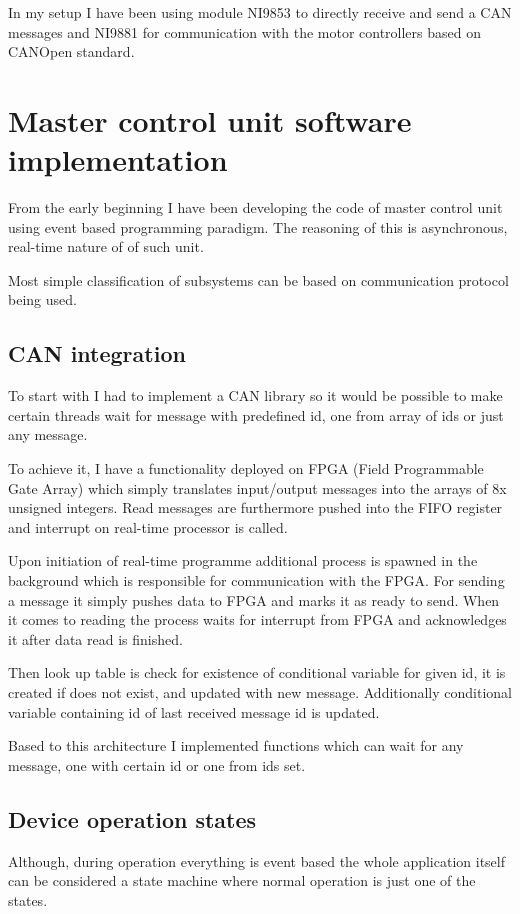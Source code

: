 In my setup I have been using module NI9853 to directly receive and send a CAN messages and NI9881 for communication with the motor controllers based on CANOpen standard.

\section{Master control unit software implementation}
From the early beginning I have been developing the code of master control unit using event based programming paradigm. The reasoning of this is asynchronous, real-time nature of of such unit.

Most simple classification of subsystems can be based on communication protocol being used. 

\subsection{CAN integration}
To start with I had to implement a CAN library so it would be possible to make certain threads wait for message with predefined id, one from array of ids or just any message. 

To achieve it, I have a functionality deployed on FPGA (Field Programmable Gate Array) which simply translates input/output messages into the arrays of 8x unsigned integers. Read messages  are furthermore pushed into the FIFO register and interrupt on real-time processor is called.

Upon initiation of real-time programme additional process is spawned in the background which is responsible for communication with the FPGA. For sending a message it simply pushes data to FPGA and marks it as ready to send. When it comes to reading the process waits for interrupt from FPGA and acknowledges it after data read is finished. 

Then look up table is check for existence of conditional variable for given id, it is created if does not exist, and updated with new message. Additionally conditional variable containing id of last received message id is updated.

Based to this architecture I implemented functions which can wait for any message, one with certain id or one from ids set.

\subsection{Device operation states}
Although, during operation everything is event based the whole application itself can be considered a state machine where normal operation is just one of the states.

